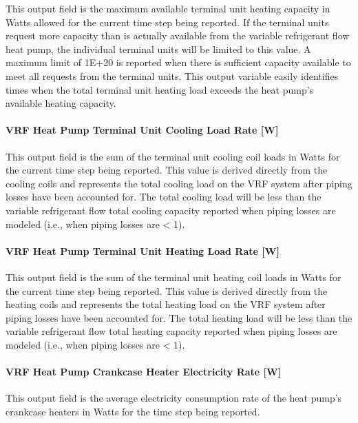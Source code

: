 This output field is the maximum available terminal unit heating capacity in Watts allowed for the current time step being reported. If the terminal units request more capacity than is actually available from the variable refrigerant flow heat pump, the individual terminal units will be limited to this value. A maximum limit of 1E+20 is reported when there is sufficient capacity available to meet all requests from the terminal units. This output variable easily identifies times when the total terminal unit heating load exceeds the heat pump's available heating capacity.

\paragraph{VRF Heat Pump Terminal Unit Cooling Load Rate {[}W{]}}\label{vrf-heat-pump-terminal-unit-cooling-load-rate-w}

This output field is the sum of the terminal unit cooling coil loads in Watts for the current time step being reported. This value is derived directly from the cooling coils and represents the total cooling load on the VRF system after piping losses have been accounted for. The total cooling load will be less than the variable refrigerant flow total cooling capacity reported when piping losses are modeled (i.e., when piping losses are \textless{} 1).

\paragraph{VRF Heat Pump Terminal Unit Heating Load Rate {[}W{]}}\label{vrf-heat-pump-terminal-unit-heating-load-rate-w}

This output field is the sum of the terminal unit heating coil loads in Watts for the current time step being reported. This value is derived directly from the heating coils and represents the total heating load on the VRF system after piping losses have been accounted for. The total heating load will be less than the variable refrigerant flow total heating capacity reported when piping losses are modeled (i.e., when piping losses are \textless{} 1).

\paragraph{VRF Heat Pump Crankcase Heater Electricity Rate {[}W{]}}\label{vrf-heat-pump-crankcase-heater-electric-power-w}

This output field is the average electricity consumption rate of the heat pump's crankcase heaters in Watts for the time step being reported.

